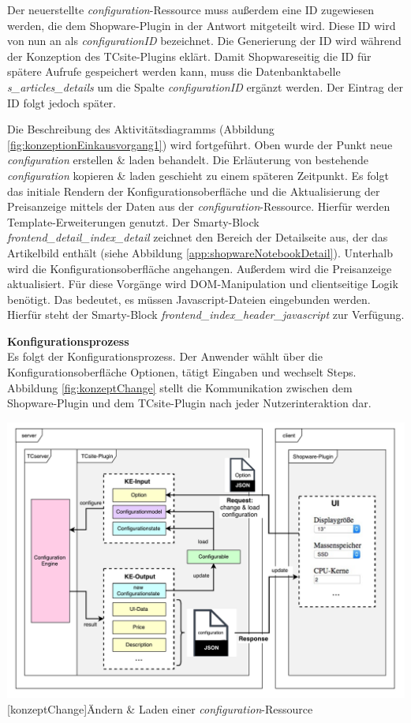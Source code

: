 \documentclass[12pt,a4paper,bibliography=totocnumbered,listof=totoc]{scrartcl}
\begin{document}
Der neuerstellte \emph{configuration}-Ressource muss außerdem eine ID zugewiesen werden, die dem Shopware-Plugin in der Antwort mitgeteilt wird. Diese ID wird von nun an als \emph{configurationID} bezeichnet. Die Generierung der ID wird während der Konzeption des TCsite-Plugins eklärt. Damit Shopwareseitig die ID für spätere Aufrufe gespeichert werden kann, muss die Datenbanktabelle \emph{s\_articles\_details} um die Spalte \emph{configurationID} ergänzt werden. Der Eintrag der ID folgt jedoch später.

Die Beschreibung des Aktivitätsdiagramms (Abbildung \ref{fig:konzeptionEinkausvorgang1}) wird fortgeführt. Oben wurde der Punkt \glqq neue \emph{configuration} erstellen \& laden\grqq{} behandelt. Die Erläuterung von \glqq bestehende \emph{configuration} kopieren \& laden\grqq{} geschieht zu einem späteren Zeitpunkt. Es folgt das initiale Rendern der Konfigurationsoberfläche und die Aktualisierung der Preisanzeige mittels der Daten aus der \emph{configuration}-Ressource. Hierfür werden Template-Erweiterungen genutzt. Der Smarty-Block \emph{frontend\_detail\_index\_detail} zeichnet den Bereich der Detailseite aus, der das Artikelbild enthält (siehe Abbildung \ref{app:shopwareNotebookDetail}). Unterhalb wird die Konfigurationsoberfläche angehangen. Außerdem wird die Preisanzeige aktualisiert. Für diese Vorgänge wird DOM-Manipulation und clientseitige Logik benötigt. Das bedeutet, es müssen Javascript-Dateien eingebunden werden. Hierfür steht der Smarty-Block \emph{frontend\_index\_header\_javascript} zur Verfügung.

\textbf{Konfigurationsprozess}\\
Es folgt der Konfigurationsprozess. Der Anwender wählt über die Konfigurationsoberfläche Optionen, tätigt Eingaben und wechselt Steps. Abbildung \ref{fig:konzeptChange} stellt die Kommunikation zwischen dem Shopware-Plugin und dem TCsite-Plugin nach jeder Nutzerinteraktion dar.

\vspace{1em}
\begin{minipage}{\linewidth}
	\centering
	\includegraphics[width=1\linewidth]{Abbildungen/konzeptChange.pdf}
	[konzeptChange]{Ändern \& Laden einer \emph{configuration}-Ressource}
	\label{fig:konzeptChange}
\end{minipage}
\vspace{1em}
\end{document}

